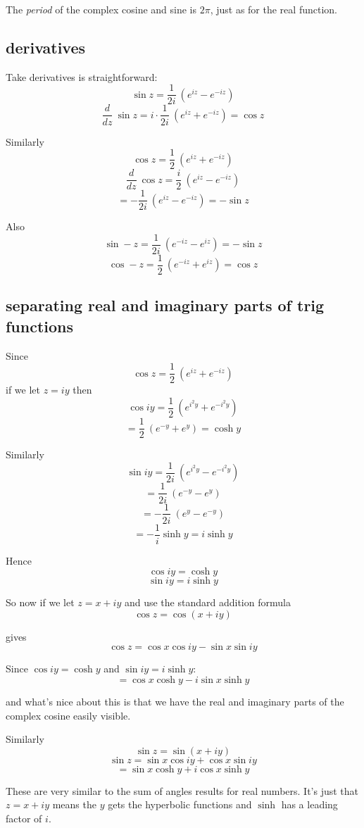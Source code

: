 \documentclass[11pt, oneside]{article}
\begin{document}
The \emph{period} of the complex cosine and sine is $2 \pi$, just as for the real function.

\subsection*{derivatives}

Take derivatives is straightforward:
\[ \sin z = \frac{1}{2i} \ (e^{iz} - e^{-iz}) \]
\[ \frac{d}{dz} \ \sin z = i \cdot \frac{1}{2i} \ (e^{iz} + e^{-iz}) = \cos z \]

Similarly
\[ \cos z = \frac{1}{2} \ (e^{iz} + e^{-iz} ) \]
\[ \frac{d}{dz} \ \cos z = \frac{i}{2} \ ( e^{iz} - e^{-iz} ) \]
\[ =- \frac{1}{2i} \ ( e^{iz} - e^{-iz} ) = -\sin z \]

Also
\[ \sin -z = \frac{1}{2i} \ (e^{-iz} - e^{iz}) = - \sin z \]
\[ \cos -z = \frac{1}{2} \ (e^{-iz} + e^{iz} ) = \cos z \]

\subsection*{separating real and imaginary parts of trig functions}

\label{sec:hyperbolics}

Since
\[ \cos z =  \frac{1}{2} \ (e^{iz} + e^{-iz}) \]
if we let $z = iy$ then
\[ \cos iy =  \frac{1}{2} \ (e^{i^2y} + e^{-i^2y}) \]
\[ =  \frac{1}{2} \ (e^{-y} + e^{y}) = \cosh y \]

Similarly
\[ \sin iy =   \frac{1}{2i} \ (e^{i^2y} - e^{-i^2y}) \]
\[ =   \frac{1}{2i} \ (e^{-y} - e^{y}) \]
\[ = - \frac{1}{2i} \ (e^y - e^{-y}) \]
\[ = - \frac{1}{i} \sinh y  = i \sinh y \]

Hence 
\[ \cos iy = \cosh y \]
\[ \sin iy =  i \sinh y \]

So now if we let $z = x + iy$ and use the standard addition formula
\[ \cos z = \cos (x + iy) \]

gives
\[ \cos z = \cos x \cos iy - \sin x \sin iy \]

Since $\cos iy = \cosh y$ and $\sin iy = i \sinh y$:
\[ = \cos x \cosh y - i \sin x \sinh y \]

and what's nice about this is that we have the real and imaginary parts of the complex cosine easily visible.  

Similarly
\[ \sin z = \sin(x + iy) \]
\[ \sin z = \sin x \cos iy + \cos x \sin iy \]
\[ = \sin x \cosh y + i \cos x \sinh y \]

These are very similar to the sum of angles results for real numbers.  It's just that $z = x + iy$ means the $y$ gets the hyperbolic functions and $\sinh$ has a leading factor of $i$.
\end{document}

